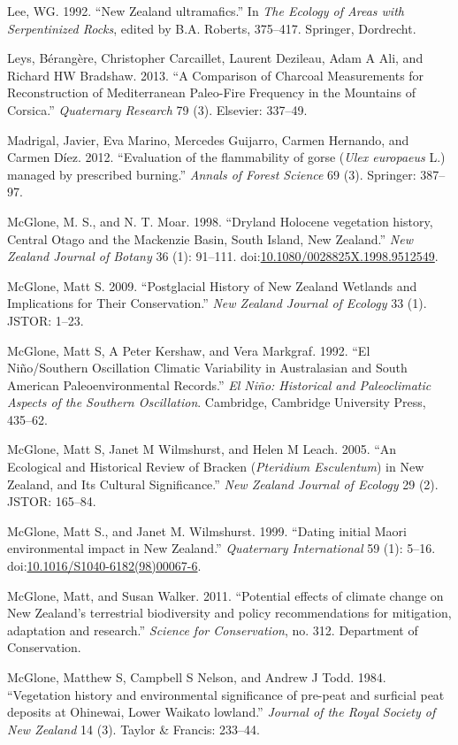 \documentclass[]{article}
\begin{document}
Lee, WG. 1992. ``New Zealand ultramafics.'' In \emph{The Ecology of Areas with Serpentinized Rocks}, edited by B.A. Roberts, 375--417. Springer, Dordrecht.

Leys, Bérangère, Christopher Carcaillet, Laurent Dezileau, Adam A Ali, and Richard HW Bradshaw. 2013. ``A Comparison of Charcoal Measurements for Reconstruction of Mediterranean Paleo-Fire Frequency in the Mountains of Corsica.'' \emph{Quaternary Research} 79 (3). Elsevier: 337--49.

Madrigal, Javier, Eva Marino, Mercedes Guijarro, Carmen Hernando, and Carmen Díez. 2012. ``Evaluation of the flammability of gorse (\emph{Ulex europaeus} L.) managed by prescribed burning.'' \emph{Annals of Forest Science} 69 (3). Springer: 387--97.

McGlone, M. S., and N. T. Moar. 1998. ``Dryland Holocene vegetation history, Central Otago and the Mackenzie Basin, South Island, New Zealand.'' \emph{New Zealand Journal of Botany} 36 (1): 91--111. doi:\href{https://doi.org/10.1080/0028825X.1998.9512549}{10.1080/0028825X.1998.9512549}.

McGlone, Matt S. 2009. ``Postglacial History of New Zealand Wetlands and Implications for Their Conservation.'' \emph{New Zealand Journal of Ecology} 33 (1). JSTOR: 1--23.

McGlone, Matt S, A Peter Kershaw, and Vera Markgraf. 1992. ``El Niño/Southern Oscillation Climatic Variability in Australasian and South American Paleoenvironmental Records.'' \emph{El Niño: Historical and Paleoclimatic Aspects of the Southern Oscillation}. Cambridge, Cambridge University Press, 435--62.

McGlone, Matt S, Janet M Wilmshurst, and Helen M Leach. 2005. ``An Ecological and Historical Review of Bracken (\emph{Pteridium Esculentum}) in New Zealand, and Its Cultural Significance.'' \emph{New Zealand Journal of Ecology} 29 (2). JSTOR: 165--84.

McGlone, Matt S., and Janet M. Wilmshurst. 1999. ``Dating initial Maori environmental impact in New Zealand.'' \emph{Quaternary International} 59 (1): 5--16. doi:\href{https://doi.org/10.1016/S1040-6182(98)00067-6}{10.1016/S1040-6182(98)00067-6}.

McGlone, Matt, and Susan Walker. 2011. ``Potential effects of climate change on New Zealand's terrestrial biodiversity and policy recommendations for mitigation, adaptation and research.'' \emph{Science for Conservation}, no. 312. Department of Conservation.

McGlone, Matthew S, Campbell S Nelson, and Andrew J Todd. 1984. ``Vegetation history and environmental significance of pre-peat and surficial peat deposits at Ohinewai, Lower Waikato lowland.'' \emph{Journal of the Royal Society of New Zealand} 14 (3). Taylor \& Francis: 233--44.
\end{document}
